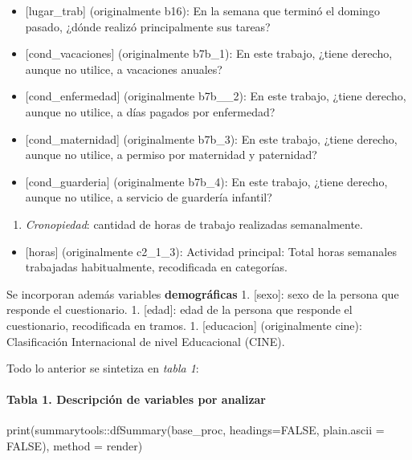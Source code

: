 \documentclass[
]{article}
\newenvironment{Shaded}{\begin{snugshade}}{\end{snugshade}}
\newcommand{\AttributeTok}[1]{\textcolor[rgb]{0.77,0.63,0.00}{#1}}
\newcommand{\ConstantTok}[1]{\textcolor[rgb]{0.00,0.00,0.00}{#1}}
\newcommand{\FunctionTok}[1]{\textcolor[rgb]{0.00,0.00,0.00}{#1}}
\newcommand{\NormalTok}[1]{#1}
\newcommand{\SpecialCharTok}[1]{\textcolor[rgb]{0.00,0.00,0.00}{#1}}
\newcommand{\StringTok}[1]{\textcolor[rgb]{0.31,0.60,0.02}{#1}}
\providecommand{\tightlist}{%
  \setlength{\itemsep}{0pt}\setlength{\parskip}{0pt}}
\begin{document}
\begin{itemize}
\tightlist
\item
  {[}lugar\_trab{]} (originalmente b16): En la semana que terminó el
  domingo pasado, ¿dónde realizó principalmente sus tareas?
\item
  {[}cond\_vacaciones{]} (originalmente b7b\_1): En este trabajo, ¿tiene
  derecho, aunque no utilice, a vacaciones anuales?
\item
  {[}cond\_enfermedad{]} (originalmente b7b\_\_2): En este trabajo,
  ¿tiene derecho, aunque no utilice, a días pagados por enfermedad?
\item
  {[}cond\_maternidad{]} (originalmente b7b\_3): En este trabajo, ¿tiene
  derecho, aunque no utilice, a permiso por maternidad y paternidad?
\item
  {[}cond\_guarderia{]} (originalmente b7b\_4): En este trabajo, ¿tiene
  derecho, aunque no utilice, a servicio de guardería infantil?\\
\end{itemize}

\begin{enumerate}
\def\labelenumi{\arabic{enumi}.}
\tightlist
\item
  \emph{Cronopiedad}: cantidad de horas de trabajo realizadas
  semanalmente.
\end{enumerate}

\begin{itemize}
\tightlist
\item
  {[}horas{]} (originalmente c2\_1\_3): Actividad principal: Total horas
  semanales trabajadas habitualmente, recodificada en categorías.
\end{itemize}

Se incorporan además variables \textbf{demográficas} 1. {[}sexo{]}: sexo
de la persona que responde el cuestionario. 1. {[}edad{]}: edad de la
persona que responde el cuestionario, recodificada en tramos. 1.
{[}educacion{]} (originalmente cine): Clasificación Internacional de
nivel Educacional (CINE).

Todo lo anterior se sintetiza en \emph{tabla 1}:

\hypertarget{tabla-1.-descripciuxf3n-de-variables-por-analizar}{%
\paragraph{Tabla 1. Descripción de variables por
analizar}\label{tabla-1.-descripciuxf3n-de-variables-por-analizar}}

\begin{Shaded}
\begin{Highlighting}[]
\FunctionTok{print}\NormalTok{(summarytools}\SpecialCharTok{::}\FunctionTok{dfSummary}\NormalTok{(base\_proc, }\AttributeTok{headings=}\ConstantTok{FALSE}\NormalTok{, }\AttributeTok{plain.ascii =} \ConstantTok{FALSE}\NormalTok{), }\AttributeTok{method =} \StringTok{\textquotesingle{}render\textquotesingle{}}\NormalTok{)}
\end{Highlighting}
\end{Shaded}
\end{document}
